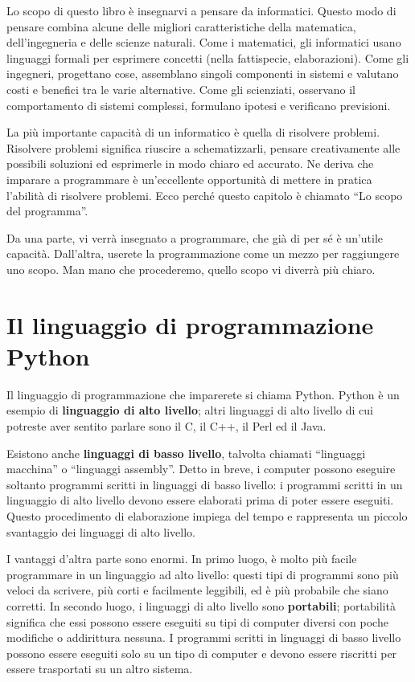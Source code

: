 \documentclass[10pt]{book}
\begin{document}
Lo scopo di questo libro è insegnarvi a pensare da informatici. Questo modo di pensare combina alcune delle migliori caratteristiche della matematica, dell'ingegneria e delle scienze naturali. Come i matematici, gli informatici usano linguaggi formali per esprimere concetti (nella fattispecie, elaborazioni). Come gli ingegneri, progettano cose, assemblano singoli componenti in sistemi e valutano costi e benefici tra le varie alternative. Come gli scienziati, osservano il comportamento di sistemi complessi, formulano ipotesi e verificano previsioni.

La più importante capacità di un informatico è quella di risolvere problemi. Risolvere problemi significa riuscire a schematizzarli, pensare creativamente alle possibili soluzioni ed esprimerle in modo chiaro ed accurato. Ne deriva che imparare a programmare è un'eccellente opportunità di mettere in pratica l'abilità di risolvere problemi. Ecco perché questo capitolo è chiamato ``Lo scopo del programma''.

Da una parte, vi verrà insegnato a programmare, che già di per sé è un'utile   capacità. Dall'altra, userete la programmazione come un mezzo per raggiungere   uno scopo. Man mano che procederemo, quello scopo vi diverrà più chiaro.

\section{Il linguaggio di programmazione Python}

Il linguaggio di programmazione che imparerete si chiama Python. Python è un   esempio di {\bf linguaggio di alto livello}; altri linguaggi di alto livello   di cui potreste aver sentito parlare sono il C, il C++, il Perl ed il Java.

Esistono anche {\bf linguaggi di basso livello}, talvolta chiamati ``linguaggi macchina'' o ``linguaggi assembly''. Detto in breve, i computer possono eseguire soltanto programmi scritti in linguaggi di basso livello: i programmi scritti in un linguaggio di alto livello devono essere elaborati prima di poter essere eseguiti. Questo procedimento di elaborazione impiega del tempo e rappresenta un piccolo svantaggio dei linguaggi di alto livello.

I vantaggi d'altra parte sono enormi. In primo luogo, è molto più facile programmare in un linguaggio ad alto livello: questi tipi di programmi sono più veloci da scrivere, più corti e facilmente leggibili, ed è più probabile che siano corretti. In secondo luogo, i linguaggi di alto livello sono {\bf portabili}; portabilità significa che essi possono essere eseguiti su tipi di computer diversi con poche modifiche o addirittura nessuna. I programmi scritti in linguaggi di basso livello possono essere eseguiti solo su un tipo di computer e devono essere riscritti per essere trasportati su un altro sistema.
\end{document}
